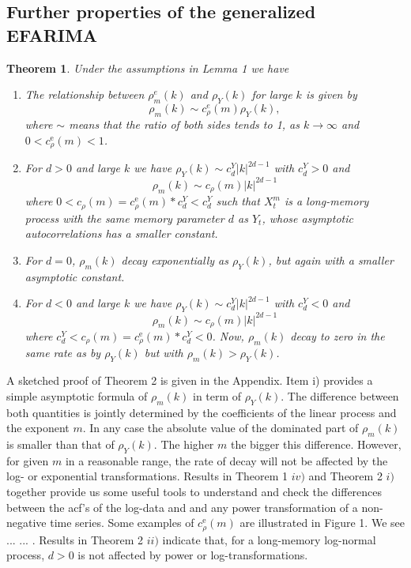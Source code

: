 \documentclass[12pt]{article}
\newtheorem{theorem}{Theorem}
\begin{document}


\subsection{Further properties of the generalized EFARIMA}

\begin{theorem}
Under the assumptions in Lemma 1 we have
%
\begin{enumerate}
\item[\rm i)] The relationship between $\rho_{m}^e(k)$ and $\rho_Y(k)$ for large $k$ is given by
\[
\rho_{m}(k)\sim c_{\rho}^e(m)\rho_Y(k), %
\]
where $\sim$ means that the ratio of both sides tends to 1, as $k\to\infty$ and $0<c_{\rho}^{\mathrm{e}}(m)<1$.

\item[\rm ii)] For $d>0$ and large $k$ we have $\rho_Y(k)\sim c_{d}^{Y}|k|^{2d-1}$ with $c_{d}^{Y}>0$ and   
\[
\rho_{m}(k)\sim c_{\rho}(m)|k|^{2d-1}%
\]
where $0<c_{\rho}(m)=c_{\rho}^{\mathrm{e}}(m)\ast c_{d}^{Y}<c_{d}^{Y}$ such that $X_t^m$ is a long-memory process with the same memory parameter $d$ as $Y_t$, whose asymptotic autocorrelations has a smaller constant.
\item[\rm iii)] For $d=0$, $\rho_{m}(k)$ decay exponentially as $\rho_Y(k)$, but again with a smaller asymptotic constant.
\item[\rm iv)] For  $d<0$ and large $k$ we have $\rho_Y(k)\sim c_{d}^{Y}|k|^{2d-1}$ with $c_{d}^{Y}<0$ and   
\[
\rho_{m}(k)\sim c_{\rho}(m)|k|^{2d-1}%
\]
where $c_{d}^{Y}<c_{\rho}(m)=c_{\rho}^{\mathrm{e}}(m)\ast c_{d}^{Y}<0$. Now, $\rho_{m}(k)$ decay to zero in the same rate as by $\rho_Y(k)$ but with $\rho_{m}(k)>\rho_Y(k)$.
\end{enumerate}
\end{theorem}
%
A sketched proof of Theorem 2 is given in the Appendix. Item i) provides a simple asymptotic formula of $\rho_{m}(k)$ in term of $\rho_Y(k)$. The difference between both quantities is jointly determined by the coefficients of the linear process and the exponent $m$. In any case the absolute value of the dominated part of $\rho_{m}(k)$ is smaller than that of $\rho_Y(k)$. The higher $m$ the bigger this difference. However, for given $m$ in a reasonable range, the rate of decay will not be affected by the log- or exponential transformations. Results in Theorem 1 $iv)$ and Theorem 2 $i)$ together provide us some useful tools to understand and check the differences between the acf's of the log-data and and any power transformation of a non-negative time series. Some examples of $c_{\rho}^{\mathrm{e}}(m)$ are illustrated in Figure 1. We see ... ... . Results in Theorem 2 $ii)$ indicate that, for a long-memory log-normal process, $d>0$ is not affected by power or log-transformations.     
\end{document}
